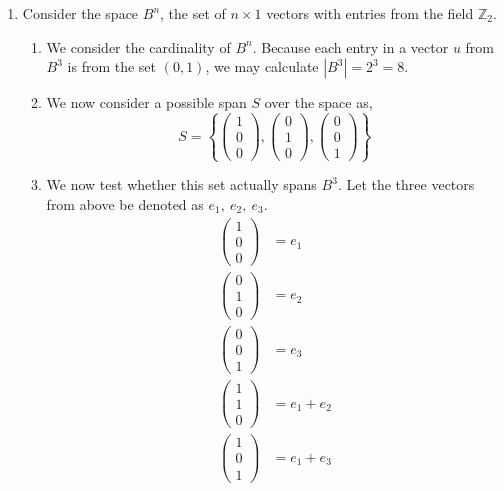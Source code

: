 \documentclass[letterpaper,10pt]{article}
\newcommand{\Z}{\mathbb{Z}}
\begin{document}
\begin{enumerate}
\item Consider the space $B^n$, the set of $n\times 1$ vectors with entries from the field $\Z_2$.
\begin{enumerate}
\item We consider the cardinality of $B^n$. Because each entry in a vector $u$ from $B^3$ is from the set $(0,1)$, we may calculate $|B^3|=2^3=8$.
\item We now consider a possible span $S$ over the space as,
\[S=\left\{ \begin{pmatrix}
1\\0\\0
\end{pmatrix}, \begin{pmatrix}
0\\1\\0
\end{pmatrix}, \begin{pmatrix}
0\\0\\1
\end{pmatrix}\right\} \]
\item We now test whether this set actually spans $B^3$. Let the three vectors from above be denoted as $e_1,\ e_2,\ e_3$.
\begin{align*}
\begin{pmatrix}
1\\0\\0
\end{pmatrix} &= e_1\\
\begin{pmatrix}
0\\1\\0
\end{pmatrix} &= e_2\\
\begin{pmatrix}
0\\0\\1
\end{pmatrix} &= e_3\\
\begin{pmatrix}
1\\1\\0
\end{pmatrix} &= e_1+e_2\\
\begin{pmatrix}
1\\0\\1
\end{pmatrix} &= e_1+e_3\\

\end{align*}
\end{enumerate}
\end{enumerate}
\end{document}
